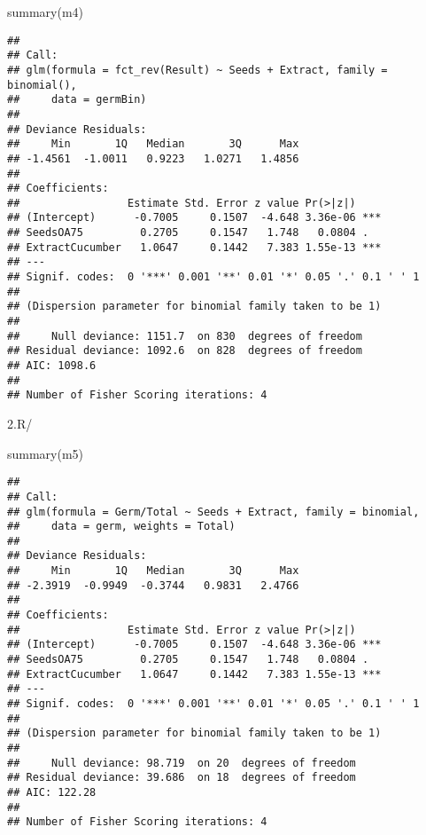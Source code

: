 \documentclass[
]{article}
\newenvironment{Shaded}{\begin{snugshade}}{\end{snugshade}}
\newcommand{\FunctionTok}[1]{\textcolor[rgb]{0.00,0.00,0.00}{#1}}
\newcommand{\NormalTok}[1]{#1}
\begin{document}
\begin{Shaded}
\begin{Highlighting}[]
\FunctionTok{summary}\NormalTok{(m4)}
\end{Highlighting}
\end{Shaded}

\begin{verbatim}
## 
## Call:
## glm(formula = fct_rev(Result) ~ Seeds + Extract, family = binomial(), 
##     data = germBin)
## 
## Deviance Residuals: 
##     Min       1Q   Median       3Q      Max  
## -1.4561  -1.0011   0.9223   1.0271   1.4856  
## 
## Coefficients:
##                 Estimate Std. Error z value Pr(>|z|)    
## (Intercept)      -0.7005     0.1507  -4.648 3.36e-06 ***
## SeedsOA75         0.2705     0.1547   1.748   0.0804 .  
## ExtractCucumber   1.0647     0.1442   7.383 1.55e-13 ***
## ---
## Signif. codes:  0 '***' 0.001 '**' 0.01 '*' 0.05 '.' 0.1 ' ' 1
## 
## (Dispersion parameter for binomial family taken to be 1)
## 
##     Null deviance: 1151.7  on 830  degrees of freedom
## Residual deviance: 1092.6  on 828  degrees of freedom
## AIC: 1098.6
## 
## Number of Fisher Scoring iterations: 4
\end{verbatim}

2.R/

\begin{Shaded}
\begin{Highlighting}[]
\FunctionTok{summary}\NormalTok{(m5)}
\end{Highlighting}
\end{Shaded}

\begin{verbatim}
## 
## Call:
## glm(formula = Germ/Total ~ Seeds + Extract, family = binomial, 
##     data = germ, weights = Total)
## 
## Deviance Residuals: 
##     Min       1Q   Median       3Q      Max  
## -2.3919  -0.9949  -0.3744   0.9831   2.4766  
## 
## Coefficients:
##                 Estimate Std. Error z value Pr(>|z|)    
## (Intercept)      -0.7005     0.1507  -4.648 3.36e-06 ***
## SeedsOA75         0.2705     0.1547   1.748   0.0804 .  
## ExtractCucumber   1.0647     0.1442   7.383 1.55e-13 ***
## ---
## Signif. codes:  0 '***' 0.001 '**' 0.01 '*' 0.05 '.' 0.1 ' ' 1
## 
## (Dispersion parameter for binomial family taken to be 1)
## 
##     Null deviance: 98.719  on 20  degrees of freedom
## Residual deviance: 39.686  on 18  degrees of freedom
## AIC: 122.28
## 
## Number of Fisher Scoring iterations: 4
\end{verbatim}
\end{document}

